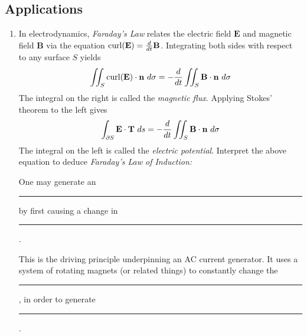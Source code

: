 \subsection*{Applications}
\begin{enumerate}[resume]
    \item In electrodynamics, \emph{Faraday's Law} relates the electric field $\mathbf{E}$ and magnetic field $\mathbf{B}$ via the equation $\operatorname{curl} (\mathbf{E})= \frac{d}{dt}\mathbf{B}$. Integrating both sides with respect to any surface $S$ yields 
    \begin{equation*}
        \iint_S \operatorname{curl} (\mathbf{E})\cdot \mathbf{n} \ d\sigma = -\frac{d}{dt}\iint_S \mathbf{B}\cdot \mathbf{n} \ d\sigma
    \end{equation*}
    The integral on the right is called the \emph{magnetic flux}. Applying Stokes' theorem to the left gives 
    \begin{equation*}
        \int_{\partial S} \mathbf{E}\cdot \mathbf{T}\ ds = -\frac{d}{dt}\iint_S \mathbf{B}\cdot \mathbf{n} \ d\sigma
    \end{equation*}
    The integral on the left is called the \emph{electric potential}. Interpret the above equation to deduce \emph{Faraday's Law of Induction:}
     \begin{center}
        One may generate an \rule{3cm}{0.15mm} by first causing a change in \rule{3cm}{0.15mm}. 
     \end{center}
     This is the driving principle underpinning an AC current generator. It uses a system of rotating magnets (or related things) to constantly change the \rule{3cm}{0.15mm}, in order to generate \rule{3cm}{0.15mm}. 
\end{enumerate}
